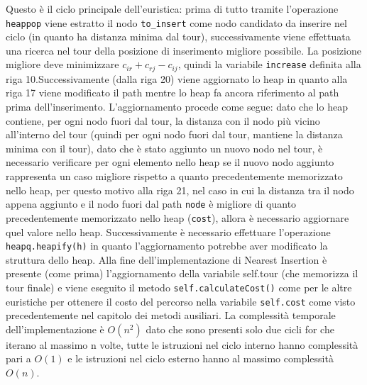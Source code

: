 \documentclass[a4paper,12pt]{report}
\begin{document}
Questo è il ciclo principale dell'euristica: prima di tutto tramite l'operazione \lstinline!heappop! viene estratto il nodo \lstinline!to_insert! come nodo candidato da inserire nel ciclo (in quanto ha distanza minima dal tour), successivamente viene effettuata una ricerca nel tour della posizione di inserimento migliore possibile. La posizione migliore deve minimizzare $c_{ir} + c_{rj} - c_{ij}$, quindi la variabile \lstinline!increase! definita alla riga 10.\newline Successivamente (dalla riga 20) viene aggiornato lo heap in quanto alla riga 17 viene modificato il path mentre lo heap fa ancora riferimento al path prima dell'inserimento. L'aggiornamento procede come segue: dato che lo heap contiene, per ogni nodo fuori dal tour, la distanza con il nodo più vicino all'interno del tour (quindi per ogni nodo fuori dal tour, mantiene la distanza minima con il tour), dato che è stato aggiunto un nuovo nodo nel tour, è necessario verificare per ogni elemento nello heap se il nuovo nodo aggiunto rappresenta un caso migliore rispetto a quanto precedentemente memorizzato nello heap, per questo motivo alla riga 21, nel caso in cui la distanza tra il nodo appena aggiunto e il nodo fuori dal path \lstinline!node! è migliore di quanto precedentemente memorizzato nello heap (\lstinline!cost!), allora è necessario aggiornare quel valore nello heap. \newline Successivamente è necessario effettuare l'operazione \lstinline!heapq.heapify(h)! in quanto l'aggiornamento potrebbe aver modificato la struttura dello heap. Alla fine dell'implementazione di Nearest Insertion è presente (come prima) l'aggiornamento della variabile self.tour (che memorizza il tour finale) e viene eseguito il metodo \lstinline!self.calculateCost()! come per le altre euristiche per ottenere il costo del percorso nella variabile  \lstinline!self.cost! come visto precedentemente nel capitolo dei metodi ausiliari. \newline
La complessità temporale dell'implementazione è $O(n^2)$ dato che sono presenti solo due cicli for che iterano al massimo n volte, tutte le istruzioni nel ciclo interno hanno complessità pari a $O(1)$ e le istruzioni nel ciclo esterno hanno al massimo complessità $O(n)$.
\end{document}
